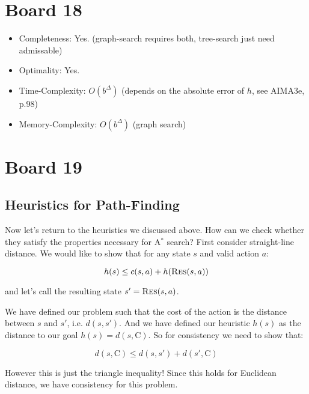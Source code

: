 \documentclass[10pt]{article}
\begin{document}
\section{Board 18}
\begin{itemize}
\item Completeness: Yes.  (graph-search requires both, tree-search just need admissable)
\item Optimality: Yes. 
\item Time-Complexity: $O(b^\Delta)$ (depends on the absolute error of $h$, see AIMA3e, p.98)
\item Memory-Complexity: $O(b^\Delta)$ (graph search)
\end{itemize}


\section{Board 19}
\subsection{Heuristics for Path-Finding}

Now let's return to the heuristics we discussed above. How can we check whether they satisfy the properties necessary for A$^*$ search? First consider straight-line distance. We would like to show that for any state $s$ and valid action $a$:

\[h(s) \leq c(s, a) + h(\mathrm{\textsc{Res}}(s, a))\]

\noindent and let's call the resulting state $s' = \mathrm{\textsc{Res}}(s, a)$.

We have defined our problem such that the cost of the action is the distance between $s$ and $s'$, i.e. $d(s, s')$. And we have defined our heuristic $h(s)$ as the distance to our goal $h(s) = d(s, \mathrm{C})$. So for consistency we need to show that: 



\[d(s, \mathrm{C}) \leq d(s, s') + d(s', \mathrm{C})\]

\noindent However this is just the triangle inequality! Since this holds for Euclidean distance, we have consistency for this problem.




\end{document}
